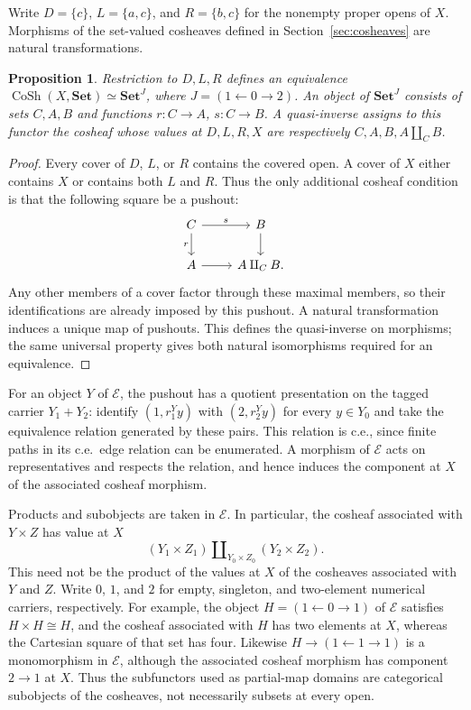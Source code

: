 \documentclass[11pt]{article}
\newtheorem{proposition}[theorem]{Proposition}
\begin{document}
Write $D=\{c\}$, $L=\{a,c\}$, and $R=\{b,c\}$ for the nonempty
proper opens of $X$. Morphisms of the set-valued cosheaves defined in
Section~\ref{sec:cosheaves} are natural transformations.

\begin{proposition}\label{prop:fork-cosheaves}
Restriction to $D,L,R$ defines an equivalence
$\operatorname{CoSh}(X,\mathbf{Set})\simeq\mathbf{Set}^{J}$,
where $J=(1\leftarrow0\to2)$. An object of $\mathbf{Set}^{J}$
consists of sets $C,A,B$ and functions $r:C\to A$, $s:C\to B$.
A quasi-inverse assigns to this functor the cosheaf whose values at
$D,L,R,X$ are respectively $C,A,B,A\amalg_C B$.
\end{proposition}
\begin{proof}
Every cover of $D$, $L$, or $R$ contains the covered open. A cover
of $X$ either contains $X$ or contains both $L$ and $R$. Thus the
only additional cosheaf condition is that the following square be
a pushout:
\[
\begin{tikzcd}
C\arrow[r,"s"]\arrow[d,"r"']&B\arrow[d]\\
A\arrow[r]&A\amalg_C B.
\end{tikzcd}
\]
Any other members of a cover factor through these maximal members,
so their identifications are already imposed by this pushout.
A natural transformation induces a unique map of pushouts.
This defines the quasi-inverse on morphisms; the same universal
property gives both natural isomorphisms required for an equivalence.
\end{proof}

For an object $Y$ of $\mathcal E$, the pushout has a
quotient presentation on the tagged carrier $Y_1+Y_2$: identify
$(1,r_1^Yy)$ with $(2,r_2^Yy)$ for every $y\in Y_0$ and take the
equivalence relation generated by these pairs. This relation is c.e.,
since finite paths in its c.e.\ edge relation can be enumerated.
A morphism of $\mathcal E$ acts on representatives and respects the
relation, and hence induces the component at $X$ of the associated
cosheaf morphism.

Products and subobjects are taken in $\mathcal E$. In
particular, the cosheaf associated with $Y\times Z$ has value at $X$
\[
 (Y_1\times Z_1)\amalg_{Y_0\times Z_0}(Y_2\times Z_2).
\]
This need not be the product of the values at $X$ of
the cosheaves associated with $Y$ and $Z$. Write $0$, $1$, and $2$
for empty, singleton, and two-element numerical carriers, respectively.
For example,
the object $H=(1\leftarrow0\to1)$ of $\mathcal E$ satisfies
$H\times H\cong H$,
and the cosheaf associated with $H$ has two elements at $X$,
whereas the Cartesian square of that set has four.
Likewise $H\to(1\leftarrow1\to1)$ is a monomorphism in $\mathcal E$,
although the associated cosheaf morphism has component $2\to1$ at $X$.
Thus the
subfunctors used as partial-map domains are categorical subobjects
of the cosheaves, not necessarily subsets at every open.
\end{document}
